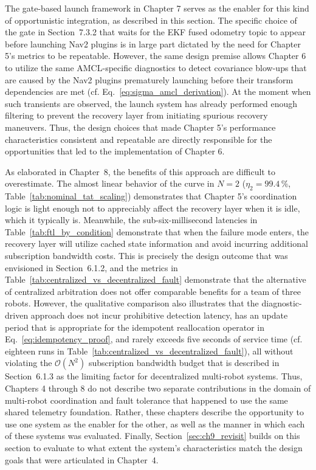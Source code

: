 The gate-based launch framework in Chapter 7 serves as the enabler for this kind of opportunistic integration, as described in this section. The specific choice of the gate in Section~7.3.2 that waits for the EKF fused odometry topic to appear before launching Nav2 plugins is in large part dictated by the need for Chapter 5's metrics to be repeatable. However, the same design premise allows Chapter 6 to utilize the same AMCL-specific diagnostics to detect covariance blow-ups that are caused by the Nav2 plugins prematurely launching before their transform dependencies are met (cf. Eq.~\eqref{eq:sigma_amcl_derivation}). At the moment when such transients are observed, the launch system has already performed enough filtering to prevent the recovery layer from initiating spurious recovery maneuvers. Thus, the design choices that made Chapter 5's performance characteristics consistent and repeatable are directly responsible for the opportunities that led to the implementation of Chapter 6.

As elaborated in Chapter~8, the benefits of this approach are difficult to overestimate. The almost linear behavior of the curve in $N=2$ ($\eta_2 = 99.4\,\%$, Table~\ref{tab:nominal_tat_scaling}) demonstrates that Chapter 5's coordination logic is light enough not to appreciably affect the recovery layer when it is idle, which it typically is. Meanwhile, the sub-six-millisecond latencies in Table~\ref{tab:ftl_by_condition} demonstrate that when the failure mode enters, the recovery layer will utilize cached state information and avoid incurring additional subscription bandwidth costs. This is precisely the design outcome that was envisioned in Section~6.1.2, and the metrics in Table~\ref{tab:centralized_vs_decentralized_fault} demonstrate that the alternative of centralized arbitration does not offer comparable benefits for a team of three robots. However, the qualitative comparison also illustrates that the diagnostic-driven approach does not incur prohibitive detection latency, has an update period that is appropriate for the idempotent reallocation operator in Eq.~\eqref{eq:idempotency_proof}, and rarely exceeds five seconds of service time (cf. eighteen runs in Table~\ref{tab:centralized_vs_decentralized_fault}), all without violating the $\mathcal{O}(N^2)$ subscription bandwidth budget that is described in Section~6.1.3 as the limiting factor for decentralized multi-robot systems. Thus, Chapters 4 through 8 do not describe two separate contributions in the domain of multi-robot coordination and fault tolerance that happened to use the same shared telemetry foundation. Rather, these chapters describe the opportunity to use one system as the enabler for the other, as well as the manner in which each of these systems was evaluated. Finally, Section~\ref{sec:ch9_revisit} builds on this section to evaluate to what extent the system's characteristics match the design goals that were articulated in Chapter~4.

